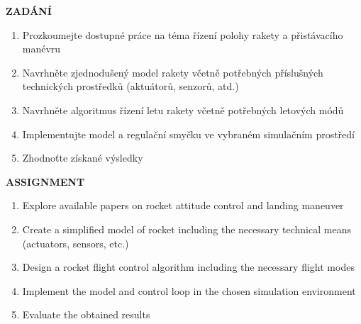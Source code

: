 \documentclass[12pt]{article}
\begin{document}
    \vfill
    \pagebreak

    \hspace{0pt}
    \vfill

    \begin{center}
        \Large
        \bf
        ZADÁNÍ
    \end{center}
    \vspace*{5mm}
    \begin{enumerate}
        \item Prozkoumejte dostupné práce na téma řízení polohy rakety a přistávacího manévru
        \item Navrhněte zjednodušený model rakety včetně potřebných příslušných technických prostředků (aktuátorů, senzorů, atd.)
        \item Navrhněte algoritmus řízení letu rakety včetně potřebných letových módů
        \item Implementujte model a regulační smyčku ve vybraném simulačním prostředí
        \item Zhodnoťte získané výsledky
    \end{enumerate}

    \vspace*{3cm}

    \begin{center}
        \Large
        \bf
        ASSIGNMENT
    \end{center}
    \vspace*{5mm}
    \begin{enumerate}
        \item Explore available papers on rocket attitude control and landing maneuver
        \item Create a simplified model of rocket including the necessary technical means (actuators, sensors, etc.)
        \item Design a rocket flight control algorithm including the necessary flight modes
        \item Implement the model and control loop in the chosen simulation environment
        \item Evaluate the obtained results
    \end{enumerate}

    \vfill
    \pagebreak

    \newpage
    \tableofcontents

    \newpage
    \printglossary[type=\acronymtype,title=Zkratky]
    \printglossary[title=Slovník pojmů]
\end{document}
